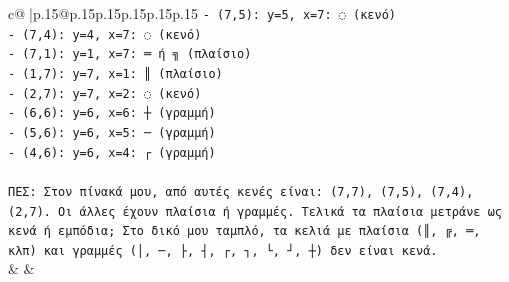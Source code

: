 \documentclass{article}
\begin{document}
{\begin{supertabular}{c@{$\;$}|p{.15\linewidth}@{}p{.15\linewidth}p{.15\linewidth}p{.15\linewidth}p{.15\linewidth}p{.15\linewidth}}
{{{\texttt{{-} (7,5): y=5, x=7: ◌ (κενό)} \\
\texttt{{-} (7,4): y=4, x=7: ◌ (κενό)} \\
\texttt{{-} (7,1): y=1, x=7: ═ ή ╗ (πλαίσιο)} \\
\texttt{{-} (1,7): y=7, x=1: ║ (πλαίσιο)} \\
\texttt{{-} (2,7): y=7, x=2: ◌ (κενό)} \\
\texttt{{-} (6,6): y=6, x=6: ┼ (γραμμή)} \\
\texttt{{-} (5,6): y=6, x=5: ─ (γραμμή)} \\
\texttt{{-} (4,6): y=6, x=4: ┌ (γραμμή)} \\
\\ 
\texttt{ΠΕΣ: Στον πίνακά μου, από αυτές κενές είναι: (7,7), (7,5), (7,4), (2,7). Οι άλλες έχουν πλαίσια ή γραμμές. Τελικά τα πλαίσια μετράνε ως κενά ή εμπόδια; Στο δικό μου ταμπλό, τα κελιά με πλαίσια (║, ╔, ═, κλπ) και γραμμές (│, ─, ├, ┤, ┌, ┐, └, ┘, ┼) δεν είναι κενά.} \\
            }
        }
    }
    & & \\ \\


\end{supertabular}}
\end{document}
